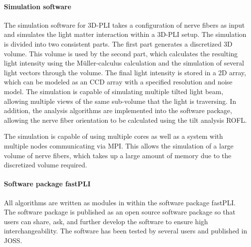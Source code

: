 \paragraph{Simulation software}
% 
The simulation software for \ac{3D-PLI} takes a configuration of nerve fibers as input and simulates the light matter interaction within a \ac{3D-PLI} setup.
The simulation is divided into two consistent parts.
The first part generates a discretized 3D volume.
This volume is used by the second part, which calculates the resulting light intensity using the M{\"u}ller-calculus calculation and the simulation of several light vectors through the volume.
The final light intensity is stored in a 2D array, which can be modeled as an \ac{CCD} array with a specified resolution and noise model.
The simulation is capable of simulating multiple tilted light beam, allowing multiple views of the same sub-volume that the light is traversing.
In addition, the analysis algorithms are implemented into the software package, allowing the nerve fiber orientation to be calculated using the tilt analysis \ac{ROFL}.
\par
% 
The simulation is capable of using multiple cores as well as a system with multiple nodes communicating via \ac{MPI}.
This allows the simulation of a large volume of nerve fibers, which takes up a large amount of memory due to the discretized volume required.
% 
% 
% 
\paragraph{Software package \acs{fastPLI}}
% 
All algorithms are written as modules in \python{} within the software package \ac{fastPLI}.
The software package is published as an open source software package so that users can share, ask, and further develop the software to ensure high interchangeability. 
The software has been tested by several users and published in \ac{JOSS}.
% 
% 
% 
